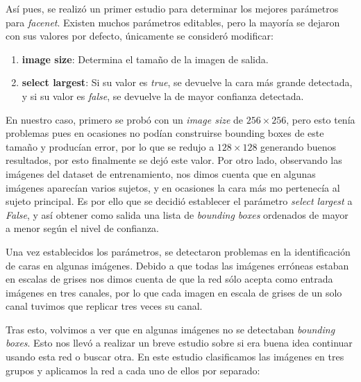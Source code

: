             \medskip

            \noindent Así pues, se realizó un primer estudio para determinar los mejores parámetros para \textit{facenet}. Existen muchos parámetros editables, pero la mayoría se dejaron con sus valores por defecto, únicamente se consideró modificar: 

            \begin{enumerate}
                \item \textbf{image size}: Determina el tamaño de la imagen de salida.
                \item \textbf{select largest}: Si su valor es \textit{true}, se devuelve la cara más grande detectada, y si su valor es \textit{false}, se devuelve la de mayor confianza detectada.
            \end{enumerate}


            \noindent En nuestro caso, primero se probó con un \textit{image size} de $256 \times 256$, pero esto tenía problemas pues en ocasiones no podían construirse bounding boxes de este tamaño y producían error, por lo que se redujo a $128 \times 128$ generando buenos resultados, por esto finalmente se dejó este valor. Por otro lado, observando las imágenes del dataset de entrenamiento, nos dimos cuenta que en algunas imágenes aparecían varios sujetos, y en ocasiones la cara más  mo pertenecía al sujeto principal. Es por ello que se decidió establecer el parámetro \textit{select largest} a \textit{False}, y así obtener como salida una lista de \textit{bounding boxes} ordenados de mayor a menor según el nivel de confianza.

            \medskip

            \noindent Una vez establecidos los parámetros, se detectaron problemas en la identificación de caras en algunas imágenes. Debido a que todas las imágenes erróneas estaban en escalas de grises nos dimos cuenta de que la red sólo acepta como entrada imágenes en tres canales, por lo que cada imagen en escala de grises de un solo canal tuvimos que replicar tres veces su canal. 
        
            \medskip
        
            \noindent Tras esto, volvimos a ver que en algunas imágenes no se detectaban \textit{bounding boxes}. Esto nos llevó a realizar un breve estudio sobre si era buena idea continuar usando esta red o buscar otra. En este estudio clasificamos las imágenes en tres grupos y aplicamos la red a cada uno de ellos por separado: 

